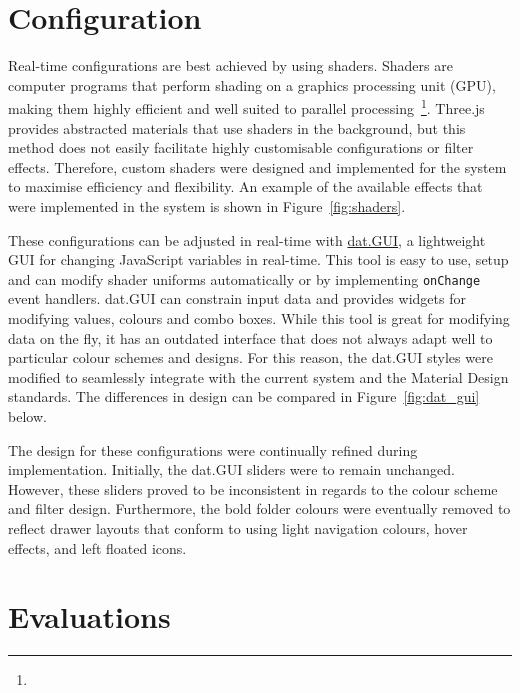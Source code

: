 \section{Configuration} {
\label{sec:configuration_implementation}

	Real-time configurations are best achieved by using shaders. Shaders are computer programs that perform shading on a graphics processing unit (GPU), making them highly efficient and well suited to parallel processing~\footnote{}. Three.js provides abstracted materials that use shaders in the background, but this method does not easily facilitate highly customisable configurations or filter effects. Therefore, custom shaders were designed and implemented for the system to maximise efficiency and flexibility. An example of the available effects that were implemented in the system is shown in Figure~\ref{fig:shaders}.

	

	These configurations can be adjusted in real-time with \href{http://workshop.chromeexperiments.com/}{dat.GUI}, a lightweight GUI for changing JavaScript variables in real-time. This tool is easy to use, setup and can modify shader uniforms automatically or by implementing \texttt{onChange} event handlers. dat.GUI can constrain input data and provides widgets for modifying values, colours and combo boxes. While this tool is great for modifying data on the fly, it has an outdated interface that does not always adapt well to particular colour schemes and designs. For this reason, the dat.GUI styles were modified to seamlessly integrate with the current system and the Material Design standards. The differences in design can be compared in Figure~\ref{fig:dat_gui} below.

	

	The design for these configurations were continually refined during implementation. Initially, the dat.GUI sliders were to remain unchanged. However, these sliders proved to be inconsistent in regards to the colour scheme and filter design. Furthermore, the bold folder colours were eventually removed to reflect drawer layouts that conform to using light navigation colours, hover effects, and left floated icons.

}

\section{Evaluations} {
\label{sec:evaluations}



}

